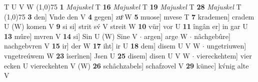\documentclass[8pt,a4paper,notitlepage]{article}
\begin{document}
\begin{table}[ht]
\begin{minipage}[t]{0.5\linewidth}
T U V W \newline
\line(1,0){75} \newline
\textbf{1} \textit{Majuskel} T  \textbf{16} \textit{Majuskel} T  \textbf{19} \textit{Majuskel} T  \textbf{28} \textit{Majuskel} T  \newline
\line(1,0){75} \newline
\textbf{3} den] Vnde den V \textbf{4} gegen] zuͦ W \textbf{5} muose] mvese T \textbf{7} krademen] cradem U (W) komen V \textbf{9} si si] strit sv́ V streit W \textbf{10} vür] vor U \textbf{11} îngân er] in gar U \textbf{13} mûre] mvren V \textbf{14} si] Sin U (W) Sine V  $\cdot$ argen] arge W  $\cdot$ nâchgebûre] nachgebvren V \textbf{15} ir] der W \textbf{17} iht] ir U \textbf{18} dem] disem U V W  $\cdot$ ungetriuwen] vngetreúwem W \textbf{23} îserînen] Jsen U \textbf{25} disem] disen U V W  $\cdot$ viereckehtem] vier ecken U viereckehten V (W) \textbf{26} schâchzabels] schafzovel V \textbf{29} künec] kv́nig alte V \newline
\end{minipage}
\end{table}
\end{document}
